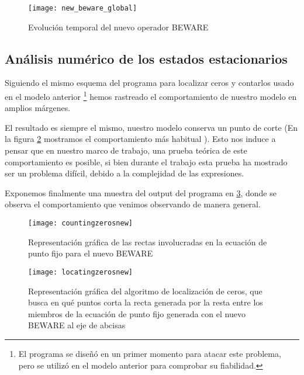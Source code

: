 \begin{figure}[h]
	\texttt{[image: new\_beware\_global]}
	\centering
	\caption{Evolución temporal del nuevo operador BEWARE}
	\label{evolu_beware}
\end{figure}

\subsection{Análisis numérico de los estados estacionarios}

Siguiendo el mismo esquema del programa para localizar ceros y contarlos usado en el modelo anterior \footnote{El programa se diseñó en un primer momento para atacar este problema, pero se utilizó en el modelo anterior para comprobar su fiabilidad.} hemos rastreado el comportamiento de nuestro modelo en amplios márgenes.

 El resultado es siempre el mismo, nuestro modelo conserva un punto de corte (En la figura \ref{locatin} mostramos el comportamiento más habitual ). Esto nos induce a pensar que en nuestro marco de trabajo, una prueba teórica de este comportamiento es posible, si bien durante el trabajo esta prueba ha mostrado ser un problema difícil, debido a la complejidad de las expresiones. 

Exponemos finalmente una muestra del output del programa en \ref{countin}, donde se observa el comportamiento que venimos observando de manera general.

\begin{figure}[h]
	\texttt{[image: countingzerosnew]}
	\centering
	\caption{Representación gráfica de las rectas involucradas en la ecuación de punto fijo para el nuevo BEWARE}
	\label{locatin}
\end{figure}
\begin{figure}[h]
	\texttt{[image: locatingzerosnew]}
	\centering
	\caption{Representación gráfica del algoritmo de localización de ceros, que busca en qué puntos corta la recta generada por la resta entre los miembros de la ecuación de punto fijo generada con el nuevo BEWARE al eje de abcisas}
	\label{countin}
\end{figure}







